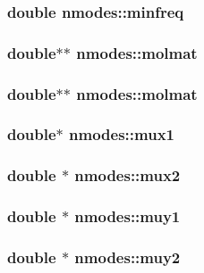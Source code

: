 \subsubsection{\setlength{\rightskip}{0pt plus 5cm}double {\bf nmodes::minfreq}}\label{structnmodes_c6f7601ac5f27d2fbf49988b7eb0b1df}


\subsubsection{\setlength{\rightskip}{0pt plus 5cm}double$\ast$$\ast$ {\bf nmodes::molmat}}\label{structnmodes_741b6b72a8e7762ab9cef1c1f19c9304}


\subsubsection{\setlength{\rightskip}{0pt plus 5cm}double$\ast$$\ast$ {\bf nmodes::molmat}}\label{structnmodes_741b6b72a8e7762ab9cef1c1f19c9304}


\subsubsection{\setlength{\rightskip}{0pt plus 5cm}double$\ast$ {\bf nmodes::mux1}}\label{structnmodes_728b643774b012fe13243cd4b196c78e}


\subsubsection{\setlength{\rightskip}{0pt plus 5cm}double $\ast$ {\bf nmodes::mux2}}\label{structnmodes_7e672d75f8bda572747dfc8f794e1938}


\subsubsection{\setlength{\rightskip}{0pt plus 5cm}double $\ast$ {\bf nmodes::muy1}}\label{structnmodes_f8c56fd1fac849fae10a0842f19c32c3}


\subsubsection{\setlength{\rightskip}{0pt plus 5cm}double $\ast$ {\bf nmodes::muy2}}\label{structnmodes_dc67fe34f97179786a9d7efeb5d3fde4}


